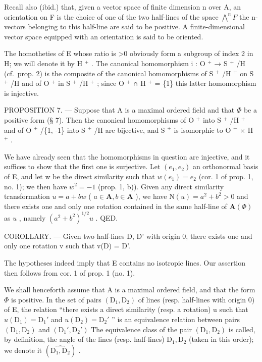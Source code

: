 Recall also (ibid.) that, given a vector space of finite dimension n over A, an orientation on F is the choice of one of the two half-lines of the space \(\bigwedge^{n}F\) the n-vectors belonging to this half-line are said to be positive. A finite-dimensional vector space equipped with an orientation is said to be oriented.

The homotheties of E whose ratio is \textgreater0 obviously form a subgroup of index 2 in H; we will denote it by H \(^{+}\) . The canonical homomorphism i : O \(^{+}\) → S \(^{+}\) /H (cf.~prop. 2) is the composite of the canonical homomorphisms of S \(^{+}\) /H \(^{+}\) on S \(^{+}\) /H and of O \(^{+}\) in S \(^{+}\) /H \(^{+}\) ; since O \(^{+}\) ∩ H \(^{+}\) = \{1\} this latter homomorphism is injective.

PROPOSITION 7. --- Suppose that A is a maximal ordered field and that \(\Phi\) be a positive form (§ 7). Then the canonical homomorphisms of O \(^{+}\) into S \(^{+}\) /H \(^{+}\) and of O \(^{+}\) /\{1, -1\} into S \(^{+}\) /H are bijective, and S \(^{+}\) is isomorphic to O \(^{+}\) × H \(^{+}\) .

We have already seen that the homomorphisms in question are injective, and it suffices to show that the first one is surjective. Let \((e_{1}, e_{2})\) an orthonormal basis of E, and let w be the direct similarity such that \(w(e_{1}) = e_{2}\) (cor. 1 of prop. 1, no. 1); we then have \(w^{2} = -1\) (prop. 1, b)). Given any direct similarity transformation \(u = a + bw\) ( \(a \in \mathbf{A}, b \in \mathbf{A}\) ), we have \(\mathrm{N}(u) = a^2 + b^2 > 0\) and there exists one and only one rotation contained in the same half-line of \(\mathbf{A}(\Phi)\) as \(u\) , namely \((a^2 + b^2)^{1/2} u\) . QED.

COROLLARY. --- Given two half-lines D, D' with origin 0, there exists one and only one rotation v such that v(D) = D'.

The hypotheses indeed imply that E contains no isotropic lines. Our assertion then follows from cor. 1 of prop. 1 (no. 1).

We shall henceforth assume that A is a maximal ordered field, and that the form \(\Phi\) is positive. In the set of pairs \((\mathrm{D}_1, \mathrm{D}_2)\) of lines (resp. half-lines with origin 0) of E, the relation “there exists a direct similarity (resp. a rotation) u such that \(u(\mathrm{D}_1) = \mathrm{D}_1'\) and \(u(\mathrm{D}_2) = \mathrm{D}_2'\) ” is an equivalence relation between pairs \((\mathrm{D}_1, \mathrm{D}_2)\) and \((\mathrm{D}_1', \mathrm{D}_2')\) The equivalence class of the pair \((\mathrm{D}_1, \mathrm{D}_2)\) is called, by definition, the angle of the lines (resp. half-lines) \(\mathrm{D}_1, \mathrm{D}_2\) (taken in this order); we denote it \((\widehat{\mathrm{D}_1, \mathrm{D}_2})\) .

